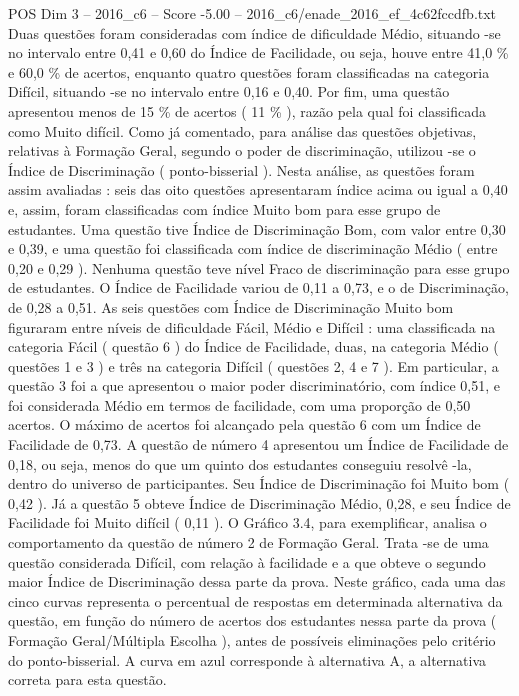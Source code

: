 \begin{textsample}{POS Dim 3 – 2016\_c6 – Score -5.00 – 2016\_c6/enade\_2016\_ef\_4c62fccdfb.txt}
Duas questões foram consideradas com índice de dificuldade Médio, situando -se no intervalo entre 0,41 e 0,60 do Índice de Facilidade, ou seja, houve entre 41,0 \% e 60,0 \% de acertos, enquanto quatro questões foram classificadas na categoria Difícil, situando -se no intervalo entre 0,16 e 0,40.
Por fim, uma questão apresentou menos de 15 \% de acertos ( 11 \% ), razão pela qual foi classificada como Muito difícil.
Como já comentado, para análise das questões objetivas, relativas à Formação Geral, segundo o poder de discriminação, utilizou -se o Índice de Discriminação ( ponto-bisserial ).
Nesta análise, as questões foram assim avaliadas : seis das oito questões apresentaram índice acima ou igual a 0,40 e, assim, foram classificadas com índice Muito bom para esse grupo de estudantes.
Uma questão tive Índice de Discriminação Bom, com valor entre 0,30 e 0,39, e uma questão foi classificada com índice de discriminação Médio ( entre 0,20 e 0,29 ).
Nenhuma questão teve nível Fraco de discriminação para esse grupo de estudantes.
O Índice de Facilidade variou de 0,11 a 0,73, e o de Discriminação, de 0,28 a 0,51.
As seis questões com Índice de Discriminação Muito bom figuraram entre níveis de dificuldade Fácil, Médio e Difícil : uma classificada na categoria Fácil ( questão 6 ) do Índice de Facilidade, duas, na categoria Médio ( questões 1 e 3 ) e três na categoria Difícil ( questões 2, 4 e 7 ).
Em particular, a questão 3 foi a que apresentou o maior poder discriminatório, com índice 0,51, e foi considerada Médio em termos de facilidade, com uma proporção de 0,50 acertos.
O máximo de acertos foi alcançado pela questão 6 com um Índice de Facilidade de 0,73.
A questão de número 4 apresentou um Índice de Facilidade de 0,18, ou seja, menos do que um quinto dos estudantes conseguiu resolvê -la, dentro do universo de participantes.
Seu Índice de Discriminação foi Muito bom ( 0,42 ).
Já a questão 5 obteve Índice de Discriminação Médio, 0,28, e seu Índice de Facilidade foi Muito difícil ( 0,11 ).
O Gráfico 3.4, para exemplificar, analisa o comportamento da questão de número 2 de Formação Geral.
Trata -se de uma questão considerada Difícil, com relação à facilidade e a que obteve o segundo maior Índice de Discriminação dessa parte da prova.
Neste gráfico, cada uma das cinco curvas representa o percentual de respostas em determinada alternativa da questão, em função do número de acertos dos estudantes nessa parte da prova ( Formação Geral/Múltipla Escolha ), antes de possíveis eliminações pelo critério do ponto-bisserial.
A curva em azul corresponde à alternativa A, a alternativa correta para esta questão.

\end{textsample}
